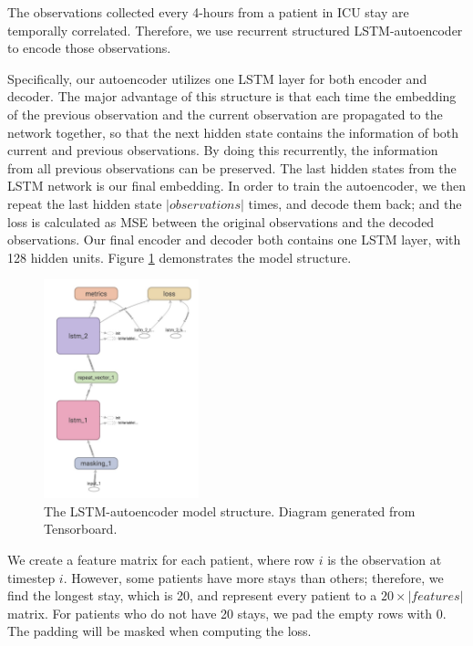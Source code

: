\documentclass[letterpaper]{article}
\begin{document}
The observations collected every 4-hours from a patient in ICU stay are temporally correlated. Therefore, we use recurrent structured LSTM-autoencoder to encode those observations. 

Specifically, our autoencoder utilizes one LSTM layer for both encoder and decoder. The major advantage of this structure is that each time the embedding of the previous observation and the current observation are propagated to the network together, so that the next hidden state contains the information of both current and previous observations. By doing this recurrently, the information from all previous observations can be preserved. The last hidden states from the LSTM network is our final embedding. In order to train the autoencoder, we then repeat the last hidden state $|observations|$ times, and decode them back; and the loss is calculated as MSE between the original observations and the decoded observations. Our final encoder and decoder both contains one LSTM layer, with 128 hidden units. Figure \ref{fig:lstm-autoencoder} demonstrates the model structure.

\begin{figure}
\centering
\includegraphics[width=0.4\textwidth]{figures/lstm-autoencoder.jpg}
\caption{\label{fig:lstm-autoencoder}The LSTM-autoencoder model structure. \tiny{Diagram generated from Tensorboard}.}
\end{figure}

We create a feature matrix for each patient, where row $i$ is the observation at timestep $i$. However, some patients have more stays than others; therefore, we find the longest stay, which is 20, and represent every patient to a $20 \times |features|$ matrix. For patients who do not have 20 stays, we pad the empty rows with 0. The padding will be masked when computing the loss.
\end{document}
